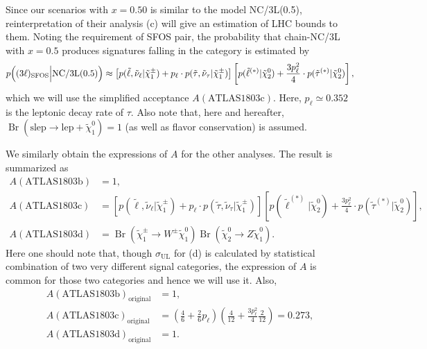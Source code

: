 \documentclass[a4paper,10pt,captions=tableheading,DIV=14]{scrartcl}
\numberwithin{equation}{section}
\newcommand\w[1]{_{\mathrm{#1}}}
\DeclareMathOperator{\Br}{\mathrm{Br}}
\newcommand\neut  [1][\relax]{{\tilde\chi^0_{#1}}}
\newcommand\charPM[1][\relax]{{\tilde\chi^\pm_{#1}}}
\begin{document}
Since our scenarios with $x=0.50$ is similar to the model NC/3L(0.5), reinterpretation of their analysis (c) will give an estimation of LHC bounds to them.
Noting the requirement of SFOS pair, the probability that chain-NC/3L with $x=0.5$ produces signatures falling in the category is estimated by
\begin{equation}
\label{eq:tau-3L-3L0.5}
 p\Bigl((3\ell)\w{SFOS}\Big|\text{NC/3L}(0.5)\Bigr)\approx
\left[
 p(\tilde\ell,\tilde\nu_\ell|\charPM[1])
+ p_\ell \cdot p(\tilde\tau,\tilde\nu_\tau|\charPM[1])
\right]
\left[
 p(\tilde\ell^{(*)}|\neut[2])
+ \frac{3p_\ell^2}{4} \cdot p(\tilde\tau^{(*)}|\neut[2])
\right],
\end{equation}
which we will use the simplified acceptance $A(\text{ATLAS1803c})$.
Here, $p_\ell\simeq0.352$ is the leptonic decay rate of $\tau$.
Also note that, here and hereafter, $\Br(\text{slep}\to\text{lep}+\neut[1])=1$ (as well as flavor conservation) is assumed.

We similarly obtain the expressions of $A$ for the other analyses. The result is summarized as
\begin{align}
 A(\text{ATLAS1803b}) &= 1,
\\
 A(\text{ATLAS1803c}) &=  \left[
 p(\tilde\ell,\tilde\nu_\ell|\charPM[1])
+ p_\ell \cdot p(\tilde\tau,\tilde\nu_\tau|\charPM[1])
\right]
\left[
 p(\tilde\ell^{(*)}|\neut[2])
+ \frac{3p_\ell^2}{4}\cdot p(\tilde\tau^{(*)}|\neut[2])
\right],
\\
 A(\text{ATLAS1803d}) &=
 \Br(\charPM[1]\to W^\pm\neut[1])
 \Br(\neut[2]\to Z\neut[1]).
\end{align}
Here one should note that, though $\sigma\w{UL}$ for (d) is calculated by statistical combination of two very different signal categories, the expression of $A$ is common for those two categories and hence we will use it.
Also,
\begin{align}
 A(\text{ATLAS1803b})\w{original} &= 1,\\
 A(\text{ATLAS1803c})\w{original} &=
\left(\frac46 + \frac26p_\ell\right)\left(\frac{4}{12}+\frac{3p_\ell^2}{4}\frac{2}{12}\right)=0.273,\\
 A(\text{ATLAS1803d})\w{original} &= 1.
\end{align}

\clearpage
\end{document}
